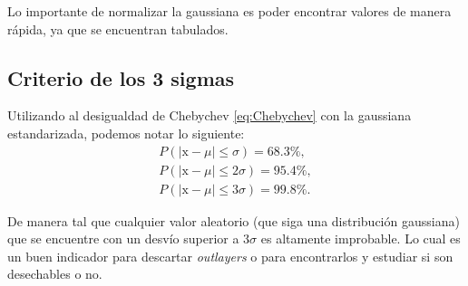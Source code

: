 \documentclass[openany]{book}
\begin{document}
Lo importante de normalizar la gaussiana es poder encontrar valores de manera rápida, ya que se encuentran tabulados.

\subsection{Criterio de los 3 sigmas}
Utilizando al desigualdad de Chebychev \eqref{eq:Chebychev} con la gaussiana estandarizada, podemos notar lo siguiente:
\begin{gather*}
  P(|\mathrm{x}-\mu|\leq\sigma)=68.3\%,\\
  P(|\mathrm{x}-\mu|\leq2\sigma)=95.4\%,\\
  P(|\mathrm{x}-\mu|\leq3\sigma)=99.8\%.
\end{gather*}
\par De manera tal que cualquier valor aleatorio (que siga una distribución gaussiana) que se encuentre con un desvío superior a $3\sigma$ es altamente improbable. Lo cual es un buen indicador para descartar \emph{outlayers} o para encontrarlos y estudiar si son desechables o no.
\end{document}
